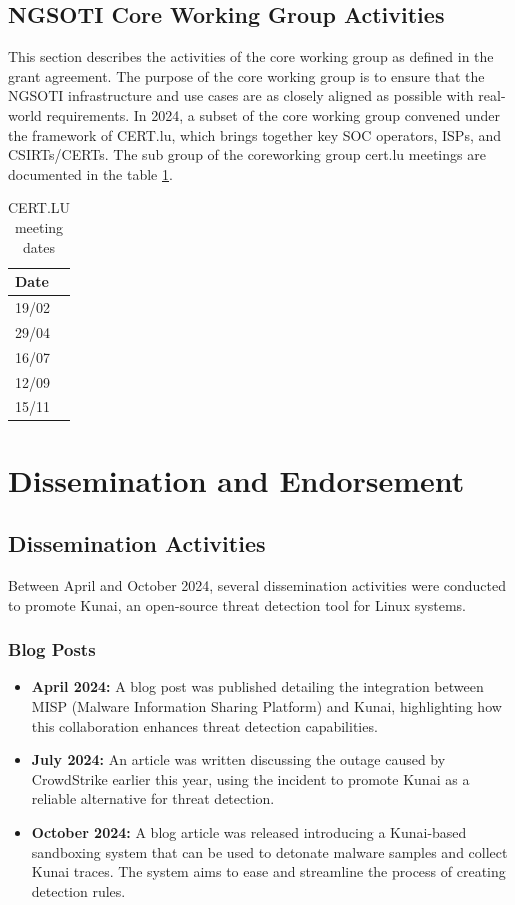 \section{NGSOTI Core Working Group Activities}
This section describes the activities of the core working group as defined in the grant agreement. The purpose of the core working group is to ensure that the NGSOTI infrastructure and use cases are as closely aligned as possible with real-world requirements. In 2024, a subset of the core working group convened under the framework of CERT.lu, which brings together key SOC operators, ISPs, and CSIRTs/CERTs.
The sub group of the coreworking group cert.lu meetings are documented in the table \ref{certlu}.

\begin{table}[H]
    \centering
    \begin{tabular}{l}
    Date\\
    \hline
    19/02\\
    29/04\\
    16/07\\
    12/09\\
    15/11\\
    \end{tabular}
    \caption{CERT.LU meeting dates}
    \label{certlu}
\end{table}

\chapter{Dissemination and Endorsement}

\section*{Dissemination Activities}

Between April and October 2024, several dissemination activities were conducted to promote Kunai, an open-source threat detection tool for Linux systems.

\subsection*{Blog Posts}
\begin{itemize}
    \item \textbf{April 2024:} A blog post was published detailing the integration between MISP (Malware Information Sharing Platform) and Kunai, highlighting how this collaboration enhances threat detection capabilities.
    \item \textbf{July 2024:} An article was written discussing the outage caused by CrowdStrike earlier this year, using the incident to promote Kunai as a reliable alternative for threat detection.
    \item \textbf{October 2024:} A blog article was released introducing a Kunai-based sandboxing system that can be used to detonate malware samples and collect Kunai traces. The system aims to ease and streamline the process of creating detection rules.
\end{itemize}

